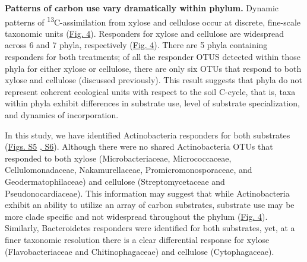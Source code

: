 \textbf{Patterns of carbon use vary dramatically within phylum.} Dynamic patterns of \textsuperscript{13}C-assimilation from xylose and cellulose occur at discrete, fine-scale taxonomic units (\href{https://authorea.com/users/3537/articles/3612/master/file/figures/bacteria_tree/bacteria_tree.png}{Fig. 4}). Responders for xylose and cellulose are widespread across 6 and 7 phyla, respectively (\href{https://authorea.com/users/3537/articles/3612/master/file/figures/bacteria_tree/bacteria_tree.png}{Fig. 4}). There are 5 phyla containing responders for both treatments; of all the responder OTUS detected within those phyla for either xylose or cellulose, there are only six OTUs that respond to both xylose and cellulose (discussed previously). This result suggests that phyla do not represent coherent ecological units with respect to the soil C-cycle, that is, taxa within phyla exhibit differences in substrate use, level of substrate specialization, and dynamics of incorporation. 

In this study, we have identified Actinobacteria responders for both substrates (\href{https://authorea.com/users/3537/articles/8459/master/file/figures/xylose_resp_profiles/xylose_resp_profiles.png}{Figs. S5} \href{https://authorea.com/users/3537/articles/8459/master/file/figures/cellulose_resp_profiles/cellulose_resp_profiles.png}{, S6}). Although there were no shared Actinobacteria OTUs that responded to both xylose (Microbacteriaceae, Micrococcaceae, Cellulomonadaceae, Nakamurellaceae, Promicromonosporaceae, and Geodermatophilaceae) and cellulose (Streptomycetaceae and Pseudonocardiaceae). This information may suggest that while Actinobacteria exhibit an ability to utilize an array of carbon substrates, substrate use may be more clade specific and not widespread throughout the phylum (\href{https://authorea.com/users/3537/articles/3612/master/file/figures/bacteria_tree/bacteria_tree.png}{Fig. 4}). Similarly, Bacteroidetes responders were identified for both substrates, yet, at a finer taxonomic resolution there is a clear differential response for xylose (Flavobacteriaceae and Chitinophagaceae) and cellulose (Cytophagaceae). 


